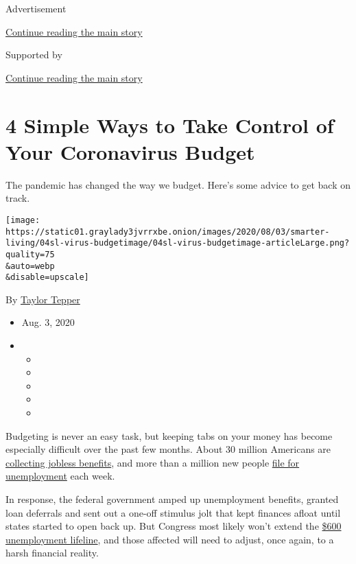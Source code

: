 Advertisement

\protect\hyperlink{after-top}{Continue reading the main story}

Supported by

\protect\hyperlink{after-sponsor}{Continue reading the main story}

\hypertarget{4-simple-ways-to-take-control-of-your-coronavirus-budget}{%
\section{4 Simple Ways to Take Control of Your Coronavirus
Budget}\label{4-simple-ways-to-take-control-of-your-coronavirus-budget}}

The pandemic has changed the way we budget. Here's some advice to get
back on track.

\texttt{[image: https://static01.graylady3jvrrxbe.onion/images/2020/08/03/smarter-living/04sl-virus-budgetimage/04sl-virus-budgetimage-articleLarge.png?quality=75\\\&auto=webp\\\&disable=upscale]}

By \href{https://www.nytimes3xbfgragh.onion/by/taylor-tepper}{Taylor
Tepper}

\begin{itemize}
\item
  Aug. 3, 2020
\item
  \begin{itemize}
  \item
  \item
  \item
  \item
  \item
  \end{itemize}
\end{itemize}

Budgeting is never an easy task, but keeping tabs on your money has
become especially difficult over the past few months. About 30 million
Americans are
\href{https://www.nytimes3xbfgragh.onion/live/2020/07/23/business/stock-market-today-coronavirus\#coin-shortage-united-states-mint}{collecting
jobless benefits}, and more than a million new people
\href{https://www.dol.gov/ui/data.pdf}{file for unemployment} each week.

In response, the federal government amped up unemployment benefits,
granted loan deferrals and sent out a one-off stimulus jolt that kept
finances afloat until states started to open back up. But Congress most
likely won't extend the
\href{https://www.nytimes3xbfgragh.onion/interactive/2020/07/24/business/economy/600-unemployment-benefits.html}{\$600
unemployment lifeline}, and those affected will need to adjust, once
again, to a harsh financial reality.

